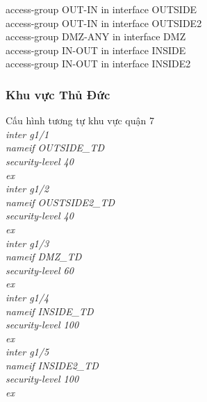 \documentclass[a4paper, 12pt]{article}
\begin{document}
{\hspace*{1cm}access-group OUT-IN in interface OUTSIDE\\
\hspace*{1cm}access-group OUT-IN in interface OUTSIDE2\\
\hspace*{1cm}access-group DMZ-ANY in interface DMZ\\
\hspace*{1cm}access-group IN-OUT in interface INSIDE\\
\hspace*{1cm}access-group IN-OUT in interface INSIDE2\\}
\subsubsection{Khu vực Thủ Đức }
\hspace*{0.25cm}Cấu hình tương tự khu vực quận 7\\
\hspace*{2cm}\textit{inter g1/1\\
\hspace*{2cm}nameif OUTSIDE\_TD\\
\hspace*{2cm}security-level 40\\
\hspace*{2cm}ex\\
\hspace*{2cm}inter g1/2\\
\hspace*{2cm}nameif OUSTSIDE2\_TD\\
\hspace*{2cm}security-level 40\\
\hspace*{2cm}ex\\
\hspace*{2cm}inter g1/3\\
\hspace*{2cm}nameif DMZ\_TD\\
\hspace*{2cm}security-level 60\\
\hspace*{2cm}ex\\
\hspace*{2cm}inter g1/4\\
\hspace*{2cm}nameif INSIDE\_TD\\
\hspace*{2cm}security-level 100\\
\hspace*{2cm}ex\\
\hspace*{2cm}inter g1/5\\
\hspace*{2cm}nameif INSIDE2\_TD\\
\hspace*{2cm}security-level 100\\
\hspace*{2cm}ex\\}
\end{document}
